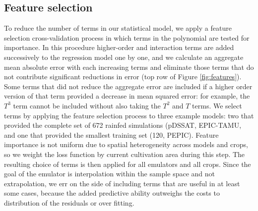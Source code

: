 \documentclass[gmd, manuscript]{copernicus} %
\begin{document}
\subsection{Feature selection} %
To reduce the number of terms in our statistical model, we apply a feature selection cross-validation process in which terms in the polynomial are tested for importance.
In this procedure higher-order and interaction terms are added successively to the regression model one by one, and 
we calculate an aggregate mean absolute error with each increasing terms and eliminate those terms that do not contribute significant reductions in error (top row of Figure \ref{fig:features}). 
Some terms that did not reduce the aggregate error are included if a higher order version of that term provided a decrease in mean squared error: for example, the $T^3$ term cannot be included without also taking the $T^2$ and $T$ terms. 
We select terms by applying the feature selection process to three example models: two that provided the complete set of 672 rainfed simulations (pDSSAT, EPIC-TAMU, and one that provided the smallest training set (120, PEPIC). 
Feature importance is not uniform due to spatial heterogeneity across models and crops, so we weight the loss function by current cultivation area during this step. 
The resulting choice of terms is then applied for all emulators and all crops. 
Since the goal of the emulator is interpolation within the sample space and not extrapolation, we err on the side of including terms that are useful in at least some cases, because the added predictive ability outweighs the costs to distribution of the residuals or over fitting.  
\end{document}
